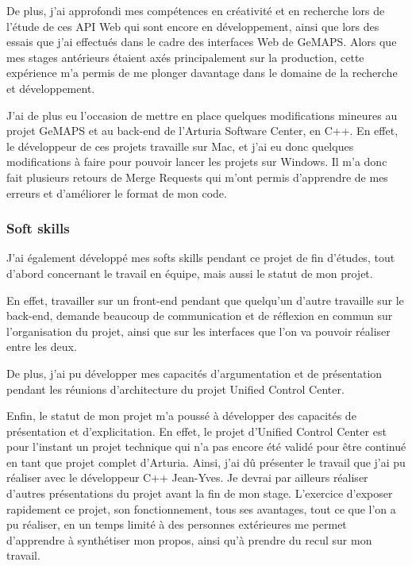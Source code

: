 \documentclass[francais]{rapportPFE}  %
\begin{document}
De plus, j'ai approfondi mes compétences en créativité et en recherche lors de l'étude de ces API Web qui sont encore en développement, ainsi que lors des essais que j'ai effectués dans le cadre des interfaces Web de GeMAPS. Alors que mes stages antérieurs étaient axés principalement sur la production, cette expérience m'a permis de me plonger davantage dans le domaine de la recherche et développement.

J'ai de plus eu l'occasion de mettre en place quelques modifications mineures au projet GeMAPS et au back-end de l'Arturia Software Center, en C++. En effet, le développeur de ces projets travaille sur Mac, et j'ai eu donc quelques modifications à faire pour pouvoir lancer les projets sur Windows. Il m'a donc fait plusieurs retours de Merge Requests qui m'ont permis d'apprendre de mes erreurs et d'améliorer le format de mon code.






\subsubsection{Soft skills}

J'ai également développé mes softs skills pendant ce projet de fin d'études, tout d'abord concernant le travail en équipe, mais aussi le statut de mon projet.

En effet, travailler sur un front-end pendant que quelqu'un d'autre travaille sur le back-end, demande beaucoup de communication et de réflexion en commun sur l'organisation du projet, ainsi que sur les interfaces que l'on va pouvoir réaliser entre les deux.

De plus, j'ai pu développer mes capacités d'argumentation et de présentation pendant les réunions d'architecture du projet Unified Control Center. 

Enfin, le statut de mon projet m'a poussé à développer des capacités de présentation et d'explicitation. En effet, le projet d'Unified Control Center est pour l'instant un projet technique qui n'a pas encore été validé pour être continué en tant que projet complet d'Arturia. Ainsi, j'ai dû présenter le travail que j'ai pu réaliser avec le développeur C++ Jean-Yves. Je devrai par ailleurs réaliser d'autres présentations du projet avant la fin de mon stage. L'exercice d'exposer rapidement ce projet, son fonctionnement, tous ses avantages, tout ce que l'on a pu réaliser, en un temps limité à des personnes extérieures me permet d'apprendre à synthétiser mon propos, ainsi qu'à prendre du recul sur mon travail.
\end{document}
